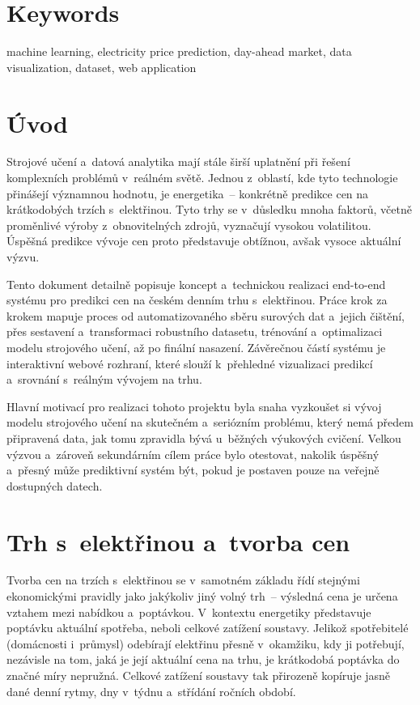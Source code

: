 \documentclass[a4paper]{article}
\begin{document}
\section*{Keywords}
machine learning, electricity price prediction, day-ahead market, data visualization, dataset, web application
\newpage

\tableofcontents
\newpage

\section{Úvod}
Strojové učení a~datová analytika mají stále širší uplatnění při řešení komplexních problémů v~reálném světě. Jednou z~oblastí, kde tyto technologie přinášejí významnou hodnotu, je energetika~-- konkrétně predikce cen na krátkodobých trzích s~elektřinou. Tyto trhy se v~důsledku mnoha faktorů, včetně proměnlivé výroby z~obnovitelných zdrojů, vyznačují vysokou volatilitou. Úspěšná predikce vývoje cen proto představuje obtížnou, avšak vysoce aktuální výzvu.

Tento dokument detailně popisuje koncept a~technickou realizaci end-to-end systému pro predikci cen na českém denním trhu s~elektřinou. Práce krok za krokem mapuje proces od automatizovaného sběru surových dat a~jejich čištění, přes sestavení a~transformaci robustního datasetu, trénování a~optimalizaci modelu strojového učení, až po finální nasazení. Závěrečnou částí systému je interaktivní webové rozhraní, které slouží k~přehledné vizualizaci predikcí a~srovnání s~reálným vývojem na trhu.

Hlavní motivací pro realizaci tohoto projektu byla snaha vyzkoušet si vývoj modelu strojového učení na skutečném a~seriózním problému, který nemá předem připravená data, jak tomu zpravidla bývá u~běžných výukových cvičení. Velkou výzvou a~zároveň sekundárním cílem práce bylo otestovat, nakolik úspěšný a~přesný může prediktivní systém být, pokud je postaven pouze na veřejně dostupných datech.
\newpage

\section{Trh s~elektřinou a~tvorba cen}
Tvorba cen na trzích s~elektřinou se v~samotném základu řídí stejnými ekonomickými pravidly jako jakýkoliv jiný volný trh~-- výsledná cena je určena vztahem mezi nabídkou a~poptávkou. V~kontextu energetiky představuje poptávku aktuální spotřeba, neboli celkové zatížení soustavy. Jelikož spotřebitelé (domácnosti i~průmysl) odebírají elektřinu přesně v~okamžiku, kdy ji potřebují, nezávisle na tom, jaká je její aktuální cena na trhu, je krátkodobá poptávka do značné míry nepružná. Celkové zatížení soustavy tak přirozeně kopíruje jasně dané denní rytmy, dny v~týdnu a~střídání ročních období.
\end{document}
